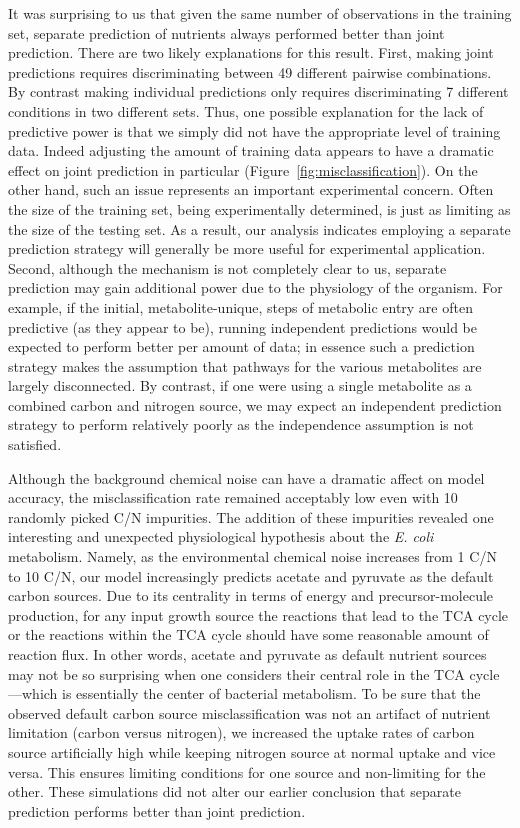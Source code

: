 \documentclass[12pt]{article}
\begin{document}
It was surprising to us that given the same number of observations in the training set, separate prediction of nutrients always performed better than joint prediction. There are two likely explanations for this result. First, making joint predictions requires discriminating between 49 different pairwise combinations. By contrast making individual predictions only requires discriminating 7 different conditions in two different sets. Thus, one possible explanation for the lack of predictive power is that we simply did not have the appropriate level of training data. Indeed adjusting the amount of training data appears to have a dramatic effect on joint prediction in particular (Figure~\ref{fig:misclassification}). On the other hand, such an issue represents an important experimental concern. Often the size of the training set, being experimentally determined, is just as limiting as the size of the testing set. As a result, our analysis indicates employing a separate prediction strategy will generally be more useful for experimental application. Second, although the mechanism is not completely clear to us, separate prediction may gain additional power due to the physiology of the organism. For example, if the initial, metabolite-unique, steps of metabolic entry are often predictive (as they appear to be), running independent predictions would be expected to perform better per amount of data; in essence such a prediction strategy makes the assumption that pathways for the various metabolites are largely disconnected. By contrast, if one were using a single metabolite as a combined carbon and nitrogen source, we may expect an independent prediction strategy to perform relatively poorly as the independence assumption is not satisfied.

Although the background chemical noise can have a dramatic affect on model accuracy, the misclassification rate remained acceptably low even with 10 randomly picked C/N impurities. The addition of these impurities revealed one interesting and unexpected physiological hypothesis about the \emph{E. coli} metabolism. Namely, as the environmental chemical noise increases from 1 C/N to 10 C/N, our model increasingly predicts acetate and pyruvate as the default carbon sources. Due to its centrality in terms of energy and precursor-molecule production, for any input growth source the reactions that lead to the TCA cycle or the reactions within the TCA cycle should have some reasonable amount of reaction flux. In other words, acetate and pyruvate as default nutrient sources may not be so surprising when one considers their central role in the TCA cycle---which is essentially the center of bacterial metabolism. To be sure that the observed default carbon source misclassification was not an artifact of nutrient limitation (carbon versus nitrogen), we increased the uptake rates of carbon source artificially high while keeping nitrogen source at normal uptake and vice versa. This ensures limiting conditions for one source and non-limiting for the other. These simulations did not alter our earlier conclusion that separate prediction performs better than joint prediction.
\end{document}
